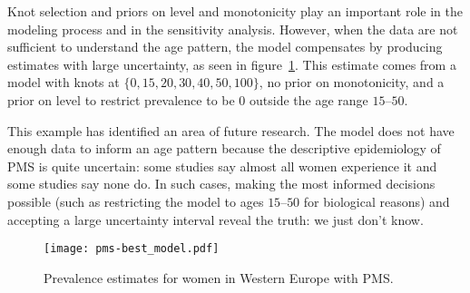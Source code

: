 Knot selection and priors on level and monotonicity play an important
role in the modeling process and in the sensitivity analysis.
However, when the data are not sufficient to understand the age
pattern, the model compensates by producing estimates with large
uncertainty, as seen in figure~\ref{fig:app-pms best}.  This estimate
comes from a model with knots at $\{0, 15, 20, 30, 40, 50, 100\}$, no
prior on monotonicity, and a prior on level to restrict prevalence to
be $0$ outside the age range $15$--$50$.

This example has identified an area of future research.  The model does
not have enough data to inform an age pattern because the descriptive
epidemiology of PMS is quite uncertain: some studies say almost all women
experience it and some studies say none do.  In such cases, making the
most informed decisions possible (such as restricting the model to
ages $15$--$50$ for biological reasons) and accepting a large uncertainty
interval reveal the truth: we just don't know.

    \begin{figure}
        \begin{center}
            \texttt{[image: pms-best\_model.pdf]}
        \end{center}
        \caption{Prevalence estimates for women
          in Western Europe with PMS.}
        \label{fig:app-pms best}
    \end{figure}


